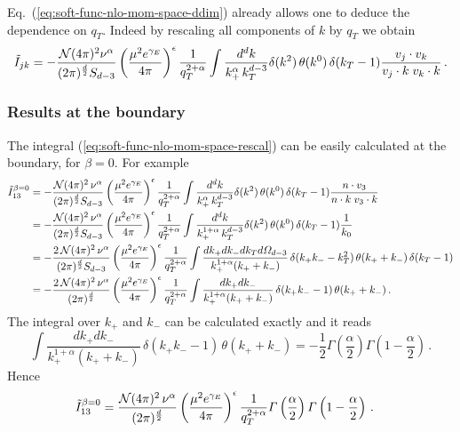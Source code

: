 \documentclass[a4paper,11pt]{report}
\numberwithin{equation}{section}
\begin{document}
Eq.~(\ref{eq:soft-func-nlo-mom-space-ddim}) already allows one to deduce the
dependence on $q_T$. Indeed by rescaling all components of $k$ by $q_T$ we
obtain
%
\begin{equation}
  \tilde I_{jk} = 
  -\frac{{\cal N} (4\pi)^2 \nu^\alpha}{(2\pi)^{\frac{d}{2}} S_{d-3}}
  \left(\frac{\mu^2 e^{\gamma_E}}{4\pi}\right)^\epsilon 
  \frac{1}{q_T^{2+\alpha}}
  \int \frac{d^d k}{k_+^\alpha\, k_T^{d-3}}
  \delta(k^2)\, \theta(k^0)\,
  \delta(k_T - 1)
  \frac{v_j \cdot v_k}{v_j \cdot k\; v_k \cdot k}\,.
  \label{eq:soft-func-nlo-mom-space-rescal}
\end{equation}

\subsubsection{Results at the boundary}

The integral (\ref{eq:soft-func-nlo-mom-space-rescal}) can be easily calculated
at the boundary, \ie for $\beta=0$. For example
%
\begin{align}
  \tilde I_{13}^{\beta=0}
  & = 
  -\frac{{\cal N} (4\pi)^2\, \nu^\alpha}{(2\pi)^{\frac{d}{2}} S_{d-3}}
  \left(\frac{\mu^2 e^{\gamma_E}}{4\pi}\right)^\epsilon 
  \frac{1}{q_T^{2+\alpha}}
  \int \frac{d^d k}{k_+^\alpha\, k_T^{d-3}}
  \delta(k^2)\, \theta(k^0)\,
  \delta(k_T - 1)
  \frac{n \cdot v_3}{n \cdot k\; v_3 \cdot k}\
  \nonumber \\
  & = 
  -\frac{{\cal N} (4\pi)^2\, \nu^\alpha}{(2\pi)^{\frac{d}{2}} S_{d-3}}
  \left(\frac{\mu^2 e^{\gamma_E}}{4\pi}\right)^\epsilon 
  \frac{1}{q_T^{2+\alpha}}
  \int \frac{d^d k}{k_+^{1+\alpha}\, k_T^{d-3}}
  \delta(k^2)\, \theta(k^0)\,
  \delta(k_T - 1)
  \frac{1}{k_0}
  \nonumber \\
  & = 
  -\frac{2\, {\cal N} (4\pi)^2\, \nu^\alpha}{(2\pi)^{\frac{d}{2}} S_{d-3}}
  \left(\frac{\mu^2 e^{\gamma_E}}{4\pi}\right)^\epsilon 
  \frac{1}{q_T^{2+\alpha}}
  \int \frac{dk_+ dk_- d k_T d\Omega_{d-3}}{k_+^{1+\alpha}(k_++k_-)}\,
  \delta(k_+ k_--k_T^2)\, \theta(k_++k_-)\,
  \delta(k_T - 1)
  \nonumber \\
  & = 
  -\frac{2\, {\cal N} (4\pi)^2\, \nu^\alpha}{(2\pi)^{\frac{d}{2}}}
  \left(\frac{\mu^2 e^{\gamma_E}}{4\pi}\right)^\epsilon 
  \frac{1}{q_T^{2+\alpha}}
  \int \frac{dk_+ dk_-}{k_+^{1+\alpha}(k_++k_-)}\,
  \delta(k_+ k_--1)\, \theta(k_++k_-)\,.
\end{align}
%
The integral over $k_+$ and $k_-$ can be calculated exactly and it reads
\begin{equation}
  \int \frac{dk_+ dk_-}{k_+^{1+\alpha}(k_++k_-)}\,
  \delta(k_+ k_--1)\, \theta(k_++k_-) = 
  -\frac12 \Gamma\left(\frac{\alpha}{2}\right) 
           \Gamma\left(1-\frac{\alpha}{2}\right)\,.
\end{equation}
%
Hence
%
\begin{align}
  \tilde I_{13}^{\beta=0}
  & = 
  \frac{{\cal N} (4\pi)^2\, \nu^\alpha}{(2\pi)^{\frac{d}{2}}}
  \left(\frac{\mu^2 e^{\gamma_E}}{4\pi}\right)^\epsilon 
  \frac{1}{q_T^{2+\alpha}} \Gamma\left(\frac{\alpha}{2}\right) 
  \Gamma\left(1-\frac{\alpha}{2}\right)\,.
\end{align}
\end{document}
